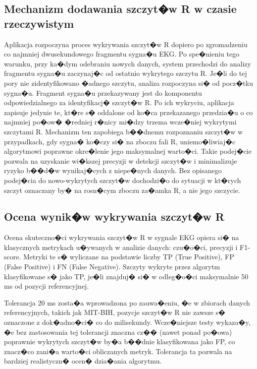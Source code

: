 \subsection{Mechanizm dodawania szczyt�w R w czasie rzeczywistym}
Aplikacja rozpoczyna proces wykrywania szczyt�w R dopiero po zgromadzeniu co
najmniej dwusekundowego fragmentu sygna�u EKG. Po spe�nieniu tego warunku, przy
ka�dym odebraniu nowych danych, system przechodzi do analizy fragmentu sygna�u
zaczynaj�c od ostatnio wykrytego szczytu R. Je�li do tej pory nie
zidentyfikowano �adnego szczytu, analiza rozpoczyna si� od pocz�tku sygna�u.
Fragment sygna�u przekazywany jest do komponentu odpowiedzialnego za
identyfikacj� szczyt�w R. Po ich wykryciu, aplikacja zapisuje jedynie te, kt�re
s� oddalone od ko�ca przekazanego przedzia�u o co najmniej po�ow� �redniej
r�nicy mi�dzy trzema wcze�niej wykrytymi szczytami R. Mechanizm ten zapobiega
b��dnemu rozpoznaniu szczyt�w w przypadkach, gdy sygna� ko�czy si� na zboczu
fali R, uniemo�liwiaj�c algorytmowi poprawne okre�lenie jego maksymalnej
warto�ci. Takie podej�cie pozwala na uzyskanie wi�kszej precyzji w detekcji
szczyt�w i minimalizuje ryzyko b��d�w wynikaj�cych z niepe�nych danych. Bez
opisanego podej�cia do nowo-wykrytych szczyt�w dochodzi�o do sytuacji w kt�rych
szczyt oznaczany by� na rosn�cym zboczu za�amka R, a nie jego szczycie.

\subsection{Ocena wynik�w wykrywania szczyt�w R}
Ocena skuteczno�ci wykrywania szczyt�w R w sygnale EKG opiera si� na
klasycznych metrykach u�ywanych w analizie danych: czu�o�ci, precyzji i
F1-score. Metryki te s� wyliczane na podstawie liczby TP (True Positive), FP
(False Positive) i FN (False Negative). Szczyty wykryte przez algorytm
klasyfikowane s� jako TP, je�li znajduj� si� w odleg�o�ci maksymalnie 50 ms od
pozycji referencyjnej.

Tolerancja 20 ms zosta�a wprowadzona po zauwa�eniu, �e w zbiorach danych
referencyjnych, takich jak MIT-BIH, pozycje szczyt�w R nie zawsze s� oznaczone
z dok�adno�ci� co do milisekundy. Wcze�niejsze testy wykaza�y, �e bez
zastosowania tej tolerancji znaczna cz�� (nawet ponad po�owa) poprawnie
wykrytych szczyt�w by�a b��dnie klasyfikowana jako FP, co znacz�co zani�a
warto�ci obliczanych metryk. Tolerancja ta pozwala na bardziej realistyczn�
ocen� dzia�ania algorytmu.

